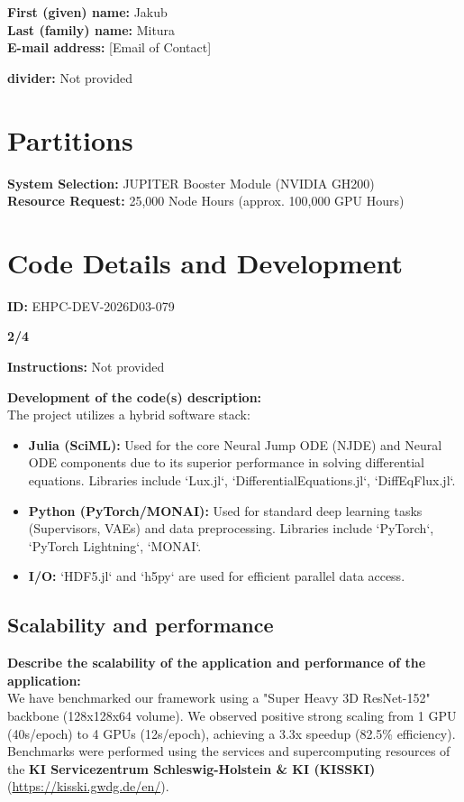 \documentclass[11pt, a4paper]{article}
\begin{document}
\noindent\textbf{First (given) name:} Jakub \\
\textbf{Last (family) name:} Mitura \\
\textbf{E-mail address:} [Email of Contact]

\vspace{0.5em}
\noindent\textbf{divider:} Not provided

\section*{Partitions}
\noindent\textbf{System Selection:} JUPITER Booster Module (NVIDIA GH200) \\
\textbf{Resource Request:} 25,000 Node Hours (approx. 100,000 GPU Hours)

\section*{Code Details and Development}
\noindent\textbf{ID:} EHPC-DEV-2026D03-079

\vspace{0.5em}
\noindent\textbf{2/4}

\vspace{0.5em}
\noindent\textbf{Instructions:} Not provided

\vspace{0.5em}
\noindent\textbf{Development of the code(s) description:} \\
The project utilizes a hybrid software stack:
\begin{itemize}
    \item \textbf{Julia (SciML):} Used for the core Neural Jump ODE (NJDE) and Neural ODE components due to its superior performance in solving differential equations. Libraries include `Lux.jl`, `DifferentialEquations.jl`, `DiffEqFlux.jl`.
    \item \textbf{Python (PyTorch/MONAI):} Used for standard deep learning tasks (Supervisors, VAEs) and data preprocessing. Libraries include `PyTorch`, `PyTorch Lightning`, `MONAI`.
    \item \textbf{I/O:} `HDF5.jl` and `h5py` are used for efficient parallel data access.
\end{itemize}

\subsection*{Scalability and performance}

\noindent\textbf{Describe the scalability of the application and performance of the application:} \\
We have benchmarked our framework using a "Super Heavy 3D ResNet-152" backbone (128x128x64 volume). We observed positive strong scaling from 1 GPU (40s/epoch) to 4 GPUs (12s/epoch), achieving a 3.3x speedup (82.5\% efficiency). Benchmarks were performed using the services and supercomputing resources of the \textbf{KI Servicezentrum Schleswig-Holstein \& KI (KISSKI)} (\url{https://kisski.gwdg.de/en/}).
\end{document}
